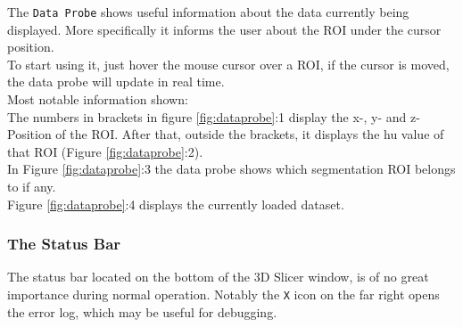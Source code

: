\noindent
The \texttt{Data Probe} shows useful information about the data currently being displayed. More specifically it informs the user about the ROI under the cursor position.\\
To start using it, just hover the mouse cursor over a ROI, if the cursor is moved, the data probe will update in real time.\\
Most notable information shown:\\
The numbers in brackets in figure \ref{fig:dataprobe}:1 display the x-, y- and z-Position of the ROI. After that, outside the brackets, it displays the \gls{hu} value of that ROI (Figure \ref{fig:dataprobe}:2).\\
In Figure \ref{fig:dataprobe}:3 the data probe shows which segmentation ROI belongs to if any.\\
Figure \ref{fig:dataprobe}:4 displays the currently loaded dataset.

\subsubsection{The Status Bar}
The status bar located on the bottom of the 3D Slicer window, is of no great importance during normal operation. Notably the \texttt{X} icon on the far right opens the error log, which may be useful for debugging.






